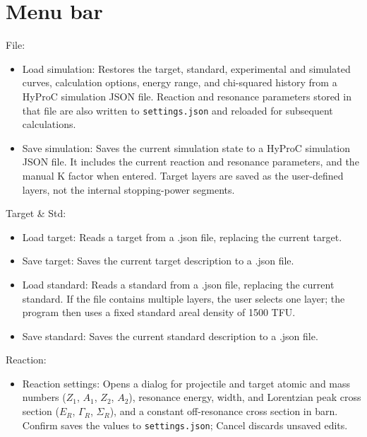 \documentclass[11pt,a4paper]{article}
\begin{document}
\section{Menu bar}
File:
\vspace{-\parskip}
\begin{itemize}
    \item Load simulation: Restores the target, standard, experimental and simulated curves, calculation options, energy range, and chi-squared history from a HyProC simulation JSON file. Reaction and resonance parameters stored in that file are also written to \texttt{settings.json} and reloaded for subsequent calculations.
    \item Save simulation: Saves the current simulation state to a HyProC simulation JSON file. It includes the current reaction and resonance parameters, and the manual K factor when entered. Target layers are saved as the user-defined layers, not the internal stopping-power segments.
\end{itemize}

Target \& Std:
\vspace{-\parskip}
\begin{itemize}
    \item Load target: Reads a target from a .json file, replacing the current target.
    \item Save target: Saves the current target description to a .json file.

    \item Load standard: Reads a standard from a .json file, replacing the current standard. If the file contains multiple layers, the user selects one layer; the program then uses a fixed standard areal density of 1500 TFU.
    \item Save standard: Saves the current standard description to a .json file.
\end{itemize}

Reaction:
\vspace{-\parskip}
\begin{itemize}
    \item Reaction settings: Opens a dialog for projectile and target atomic and mass numbers ($Z_1$, $A_1$, $Z_2$, $A_2$), resonance energy, width, and Lorentzian peak cross section ($E_R$, $\Gamma_R$, $\Sigma_R$), and a constant off-resonance cross section in barn. Confirm saves the values to \texttt{settings.json}; Cancel discards unsaved edits.
\end{itemize}
\end{document}
